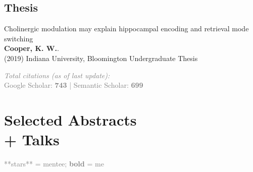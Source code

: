 \documentclass[10pt]{cooperCV2}
\begin{document}
 

	

\subsection{Thesis} 
% 
\begin{etaremune}[resume,itemindent=-1.5\bibhang, topsep=0pt,
				   itemsep=\bibsep,partopsep=0pt,parsep=0pt,leftmargin={\bibhang+\widthof{[999]}}] 
    
    \item Cholinergic modulation may explain hippocampal encoding and retrieval mode switching \\
     \textbf{Cooper, K. W.}. \\ (2019) Indiana University, Bloomington Undergraduate Thesis  
     
	

\end{etaremune}



\vspace{0.5cm}
\textcolor{grey}{
\textit{Total citations (as of last update):} \\
\textbf{\aiGoogleScholar} \hspace{0.05cm} Google Scholar: \textbf{743} | \textbf{\aiSemanticScholar} \hspace{0.05cm} Semantic Scholar: \textbf{699}\\
}





%	






\section{Selected Abstracts\\+ Talks}
\textcolor{grey}{**stars** = mentee; \textbf{bold} = me}\\
\end{document}
